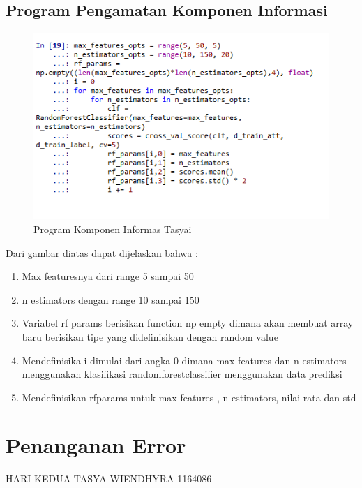 \subsection{Program Pengamatan Komponen Informasi}
\begin{figure}[ht]
\centering
\includegraphics[scale=0.5]{figures/praktektasya11.png}
\caption{Program Komponen Informas Tasyai}
\label{Praktek}
\end{figure}
Dari gambar diatas dapat dijelaskan bahwa :
\begin{enumerate}
\item Max featuresnya dari range 5 sampai 50
\item n estimators dengan range 10 sampai 150
\item Variabel rf params berisikan function np empty dimana akan membuat array baru berisikan tipe yang didefinisikan dengan random value
\item Mendefinisika i dimulai dari angka 0 dimana max features dan n estimators menggunakan klasifikasi randomforestclassifier menggunakan data prediksi
\item Mendefinisikan rfparams untuk max features , n estimators, nilai rata dan std
\end{enumerate}

\section{Penanganan Error}
HARI KEDUA TASYA WIENDHYRA 1164086
